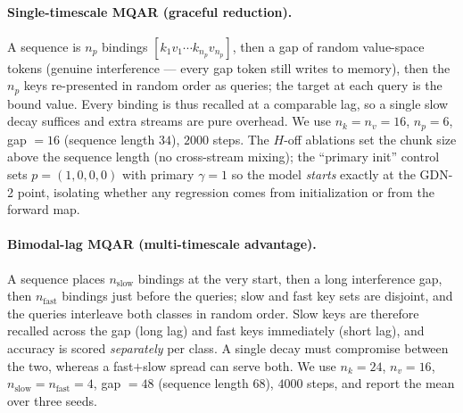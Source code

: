 \documentclass[11pt,letterpaper,logo]{yalearxiv}
\begin{document}
\paragraph{Single-timescale MQAR (graceful reduction).} A sequence is
$n_p$ bindings $[k_1 v_1 \cdots k_{n_p} v_{n_p}]$, then a gap of random
value-space tokens (genuine interference --- every gap token still writes to
memory), then the $n_p$ keys re-presented in random order as queries; the target
at each query is the bound value. Every binding is thus recalled at a comparable
lag, so a single slow decay suffices and extra streams are pure overhead. We use
$n_k = n_v = 16$, $n_p = 6$, gap $=16$ (sequence length $34$), $2000$ steps. The
$H$-off ablations set the chunk size above the sequence length (no cross-stream
mixing); the ``primary init'' control sets $p = (1,0,0,0)$ with primary
$\gamma = 1$ so the model \emph{starts} exactly at the GDN-2 point, isolating
whether any regression comes from initialization or from the forward map.

\paragraph{Bimodal-lag MQAR (multi-timescale advantage).} A sequence places
$n_{\text{slow}}$ bindings at the very start, then a long interference gap, then
$n_{\text{fast}}$ bindings just before the queries; slow and fast key sets are
disjoint, and the queries interleave both classes in random order. Slow keys are
therefore recalled across the gap (long lag) and fast keys immediately (short
lag), and accuracy is scored \emph{separately} per class. A single decay must
compromise between the two, whereas a fast$+$slow spread can serve both. We use
$n_k = 24$, $n_v = 16$, $n_{\text{slow}} = n_{\text{fast}} = 4$, gap $=48$
(sequence length $68$), $4000$ steps, and report the mean over three seeds.
\end{document}
